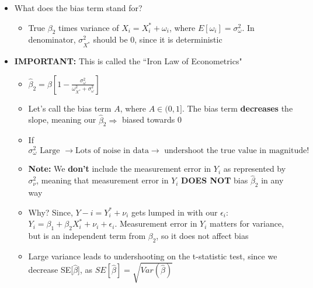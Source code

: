 \documentclass[10pt, oneside]{article}
\begin{document}
\begin{itemize}
\begin{itemize}
\begin{itemize}
            \item What does the bias term stand for?
            \begin{itemize}
                \item True $\beta_2$ times variance of $X_i = X_i^* + \omega_i$, where $E[\omega_i] = \sigma^2_\omega$. In denominator, $\sigma^2_{X^*}$ should be $0$, since it is deterministic
            \end{itemize}
            \item \textbf{IMPORTANT:} This is called the ``Iron Law of Econometrics"
                \begin{itemize}
                    \item $\hat \beta_2 = \beta[1- \frac{\sigma^2 _\omega}{\omega^2_{X^*} + \sigma^2 _\omega}]$
                    \item Let's call the bias term $A$, where $A\in (0,1]$. The bias term \textbf{decreases} the slope, meaning our $\hat \beta_2 \Rightarrow$ biased towards 0 
                    \item If $\sigma^2_\omega \text{ Large } \rightarrow \text{Lots of noise in data} \rightarrow \text{ undershoot the true value in magnitude!}$
                    \item \textbf{Note:} We \textbf{don't} include the measurement error in $Y_i$ as represented by $\sigma^2_\nu$, meaning that measurement error in $Y_i$ \textbf{DOES NOT} bias $\hat \beta_2$ in any way
                    \item Why? Since, $Y-i = Y^*_i +\nu_i$ gets lumped in with our $\epsilon_i$: $Y_i = \beta_1 + \beta_2 X_i^* + \nu_i + \epsilon_i$. Measurement error in $Y_i$ matters for variance, but is an independent term from $\beta_2$, so it does not affect bias
                    \item Large variance leads to undershooting on the t-statistic test, since we decrease SE[$\hat \beta$], as $SE[\hat \beta] = \sqrt{Var(\hat \beta)}$
                \end{itemize}
        \end{itemize}
    \end{itemize}
\end{itemize}


\end{document}
